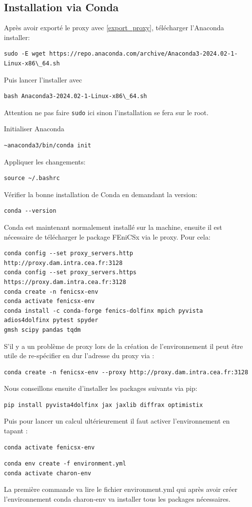 \documentclass[10pt]{book}
\begin{document}
\subsection{Installation via Conda}\label{Subsection:Conda}
Après avoir exporté le proxy avec \eqref{export_proxy}, télécharger l'Anaconda installer:
\begin{verbatim}
sudo -E wget https://repo.anaconda.com/archive/Anaconda3-2024.02-1-Linux-x86\_64.sh
\end{verbatim}
Puis lancer l'installer avec
\begin{verbatim}
bash Anaconda3-2024.02-1-Linux-x86\_64.sh
\end{verbatim}
\begin{Rem}{Attention ne pas faire \texttt{sudo} ici sinon l'installation se fera sur le root.}\end{Rem}
Initialiser Anaconda
\begin{verbatim}
~anaconda3/bin/conda init
\end{verbatim}
Appliquer les changements:
\begin{verbatim}
source ~/.bashrc
\end{verbatim}
Vérifier la bonne installation de Conda en demandant la version:
\begin{verbatim}
conda --version
\end{verbatim}
Conda est maintenant normalement installé sur la machine, ensuite il est nécessaire de télécharger le package FEniCSx via le proxy. Pour cela:
\begin{verbatim}
conda config --set proxy_servers.http http://proxy.dam.intra.cea.fr:3128
conda config --set proxy_servers.https https://proxy.dam.intra.cea.fr:3128
conda create -n fenicsx-env
conda activate fenicsx-env
conda install -c conda-forge fenics-dolfinx mpich pyvista adios4dolfinx pytest spyder 
gmsh scipy pandas tqdm
\end{verbatim}
S'il y a un problème de proxy lors de la création de l'environnement il peut être utile de re-spécifier en dur l'adresse du proxy via :
\begin{verbatim}
conda create -n fenicsx-env --proxy http://proxy.dam.intra.cea.fr:3128
\end{verbatim}
Nous conseillons ensuite d'installer les packages suivants via pip:
\begin{verbatim}
pip install pyvista4dolfinx jax jaxlib diffrax optimistix
\end{verbatim}
Puis pour lancer un calcul ultérieurement il faut activer l'environnement en tapant :
\begin{verbatim}
conda activate fenicsx-env
\end{verbatim}
\begin{verbatim}
conda env create -f environment.yml
conda activate charon-env
\end{verbatim}
La première commande va lire le fichier environment.yml qui après avoir créer l'environnement conda charon-env va installer tous les packages nécessaires.
\end{document}
